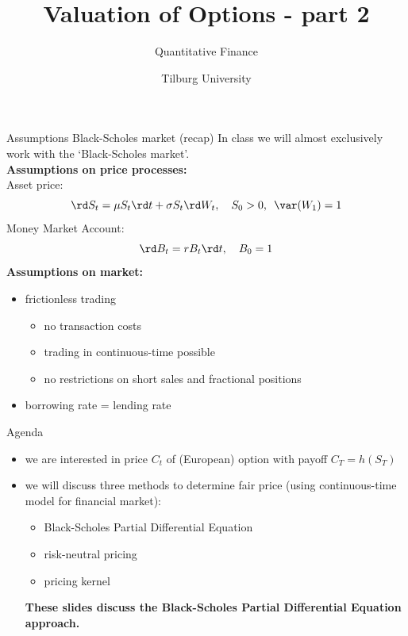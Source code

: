 \documentclass[pdf, handout]{beamer}
\title{Valuation of Options - part 2}
\subtitle{Quantitative Finance}
\author{Tilburg University}
\institute{Ramon van den Akker}
\date{}
\begin{document}
\begin{frame}
\titlepage
\end{frame}

\begin{frame}{Assumptions  Black-Scholes market (recap)}
In class we will almost exclusively work with the `Black-Scholes market'.
\\ \vspace{.5cm}
\textbf{Assumptions on price processes:} \\
Asset price:
\[
\rd S_t=\mu S_t \rd t + \sigma S_t \rd W_t,\quad S_0>0,\,\,\, \var(W_1) = 1
\]
Money Market Account:
\[
\rd B_t= r B_t \rd t,\quad B_0=1
\]
\textbf{Assumptions on market:} \\
\begin{itemize}
\item frictionless trading
\begin{itemize}
\item no transaction costs
\item trading in continuous-time possible
\item no restrictions on short sales and fractional positions
\end{itemize}
\item borrowing rate = lending rate
\end{itemize}
\end{frame}
%

\begin{frame}{Agenda}
\begin{itemize}
\item we are interested in  price $C_t$ of (European) option with payoff $C_T=h(S_T)$
\item we will discuss three methods to determine fair price (using continuous-time model for financial market):
\begin{itemize}
\item Black-Scholes Partial Differential Equation
\item risk-neutral pricing
\item pricing kernel
\end{itemize}
\textbf{These slides discuss the Black-Scholes Partial Differential Equation approach.}
\end{itemize}
\end{frame}
\end{document}
